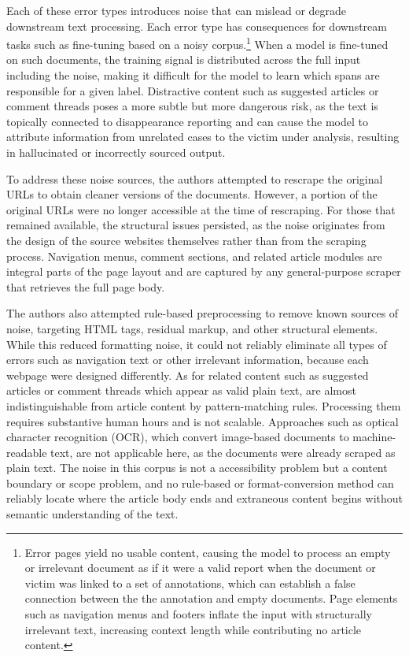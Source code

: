 \documentclass{article}
\begin{document}
Each of these error types introduces noise that can mislead or
degrade downstream text processing. Each error type has consequences for downstream tasks such as fine-tuning based on a noisy corpus.\footnote{Error pages yield no usable content, causing the model to process an empty or irrelevant document as if it were a valid report when the document or victim was linked to a set of annotations, which can establish a false connection
between the the annotation and empty documents. Page elements such as
navigation menus and footers inflate the input with structurally
irrelevant text, increasing context length while contributing no article
content.} When a model is fine-tuned on such documents, the training
signal is distributed across the full input including the noise, making
it difficult for the model to learn which spans are responsible for a
given label. Distractive content such as suggested articles or comment
threads poses a more subtle but more dangerous risk, as the text is
topically connected to disappearance reporting and can cause the model
to attribute information from unrelated cases to the victim under
analysis, resulting in hallucinated or incorrectly sourced output.

To address these noise sources, the authors attempted to rescrape
the original URLs to obtain cleaner versions of the documents. However,
a portion of the original URLs were no longer accessible at the time of
rescraping. For those that remained available, the structural issues
persisted, as the noise originates from the design of the source
websites themselves rather than from the scraping process. Navigation
menus, comment sections, and related article modules are integral parts
of the page layout and are captured by any general-purpose scraper that
retrieves the full page body.

The authors also attempted rule-based preprocessing to remove known
sources of noise, targeting HTML tags, residual markup, and other
structural elements. While this reduced formatting noise, it could not
reliably eliminate all types of errors such as navigation text or other
irrelevant information, because each webpage were designed differently.
As for related content such as suggested articles or comment threads
which appear as valid plain text, are almost indistinguishable from
article content by pattern-matching rules. Processing them requires
substantive human hours and is not scalable. Approaches such as optical
character recognition (OCR), which convert image-based documents to
machine-readable text, are not applicable here, as the documents were
already scraped as plain text. The noise in this corpus is not a
accessibility problem but a content boundary or scope problem, and no
rule-based or format-conversion method can reliably locate where the
article body ends and extraneous content begins without semantic
understanding of the text.
\end{document}
